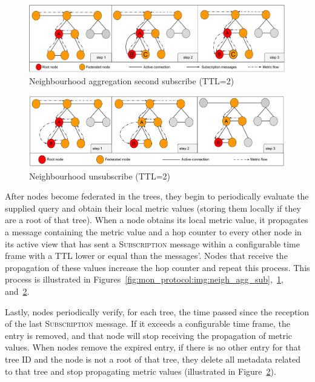 \begin{figure}[htbp]
    \centering
    \includegraphics[width=\textwidth]{Chapters/aggregation/images/2nd_subscribe.pdf}
    \caption{Neighbourhood aggregation second subscribe (TTL=2)}
    \label{fig:mon_protocol:img:neigh_agg_second_sub}
\end{figure}


\begin{figure}[htbp]
    \centering
    \includegraphics[width=\textwidth]{Chapters/aggregation/images/unsubscribe_process.pdf}
    \caption{Neighbourhood unsubscribe (TTL=2)}
    \label{fig:mon_protocol:img:neigh_agg_unsub}
\end{figure}

After nodes become federated in the trees, they begin to periodically evaluate the supplied query and obtain their local metric values (storing them locally if they are a root of that tree). When a node obtains its local metric value, it propagates a message containing the metric value and a hop counter to every other node in its active view that has sent a \textsc{Subscription} message within a configurable time frame with a TTL lower or equal than the messages'. Nodes that receive the propagation of these values increase the hop counter and repeat this process. This process is illustrated in Figures~\ref{fig:mon_protocol:img:neigh_agg_sub},~\ref{fig:mon_protocol:img:neigh_agg_second_sub}, and~\ref{fig:mon_protocol:img:neigh_agg_unsub}. 
    
Lastly, nodes periodically verify, for each tree, the time passed since the reception of the last \textsc{Subscription} message. If it exceeds a configurable time frame, the entry is removed, and that node will stop receiving the propagation of metric values. When nodes remove the expired entry, if there is no other entry for that tree ID and the node is not a root of that tree, they delete all metadata related to that tree and stop propagating metric values (illustrated in Figure~\ref{fig:mon_protocol:img:neigh_agg_unsub}).


